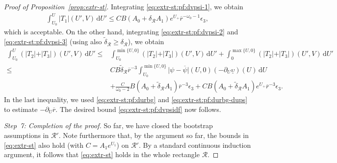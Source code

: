 \documentclass[10pt, reqno]{amsart}
\theoremstyle{definition}
\theoremstyle{remark}
\theoremstyle{conjecture}
\numberwithin{equation}{section}
\newcommand{\abs}[1]{\vert#1\vert}
\newcommand{\set}[1]{\{#1\}}
\newcommand{\ud}{\mathrm{d}}
\newcommand{\rd}{\partial}
\newcommand{\0}{\emptyset}
\newcommand{\dlt}{\delta}
\newcommand{\eps}{\epsilon}
\newcommand{\omg}{\omega}
\newcommand{\ups}{\upsilon}
\newcommand{\calR}{\mathcal R}
\newcommand{\pfstep}[1]{\vspace{.5em} {\it \noindent #1.}}
\newcommand{\psibg}{\overline{\psi}}				%
\newcommand{\rbg}{\overline{r}}					%
\begin{document}
\begin{proof}[Proof of Proposition~\ref{prop:extr-st}]
Integrating \eqref{eq:extr-st:pf:dvpsi-1}, we obtain
\begin{align*}
	\int_{U_{0}}^{U} \abs{T_{1}}(U', V) \, \ud U'
	\leq C B (A_{0} + \dlt_{\calR} A_{1}) e^{U_{+}} \rbg^{-\omg_0-1} \eps_{3},
\end{align*}
which is acceptable. On the other hand, integrating \eqref{eq:extr-st:pf:dvpsi-2} and \eqref{eq:extr-st:pf:dvpsi-3} (using also $\widetilde{\dlt}_{\calR} \geq \dlt_{\calR}$), we obtain
\begin{align*}
	\int_{U_{0}}^{U} (\abs{T_{2}} + \abs{T_{3}})(U', V) \, \ud U'
	\leq & \int_{U_{0}}^{\min \set{U, 0}} (\abs{T_{2}} + \abs{T_{3}})(U', V) \, \ud U' + \int_{0}^{\max \set{U, 0}} (\abs{T_{2}} + \abs{T_{3}})(U', V) \, \ud U' \\
	\leq & C B \tilde{\dlt}_{\calR} \rbg^{-3} \int_{U_{0}}^{\min \set{U, 0}} \abs{\psi - \psibg}(U, 0) (-\rd_{U} \underline{\ups})(U) \, \ud U \\
	& + \frac{C}{\omg_0-2} B (A_{0} + \widetilde{\dlt}_{\calR} A_{1}) \rbg^{-3} \eps_{3} 
	 + C B (A_{0} + \widetilde{\dlt}_{\calR} A_{1}) e^{U_{+}} \rbg^{-3} \eps_{3}.
\end{align*}
In the last inequality, we used \eqref{eq:extr-st:pf:durbg} and \eqref{eq:extr-st:pf:durbg-dups} to estimate $-\rd_{U} \rbg$. The desired bound \eqref{eq:extr-st:pf:dvpsidf} now follows.

\pfstep{Step~7: Completion of the proof}
So far, we have closed the bootstrap assumptions in $\calR'$. Note furthermore that, by the argument so far, the bounds in \eqref{eq:extr-st} also hold (with $C = A_{1} e^{U_{1}}$) on $\calR'$. By a standard continuous induction argument, it follows that \eqref{eq:extr-st} holds in the whole rectangle $\calR$.


\end{proof}
\end{document}
